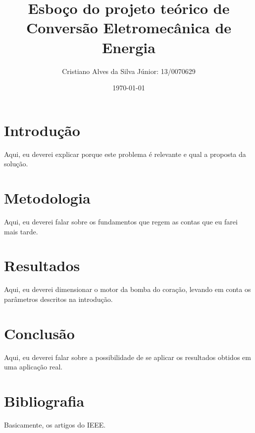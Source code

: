 \documentclass[12pt, a4paper, twoside]{article}
\begin{document}
\title{Esboço do projeto teórico de Conversão Eletromecânica de Energia}
\author{Cristiano Alves da Silva Júnior: 13/0070629}
\date{\today}
\maketitle

\section{Introdução}

Aqui, eu deverei explicar porque este problema é relevante e qual a proposta da solução.

\section{Metodologia}

Aqui, eu deverei falar sobre os fundamentos que regem as contas que eu farei mais tarde.



\section{Resultados}

Aqui, eu deverei dimensionar o motor da bomba do coração, levando em conta os parâmetros descritos na introdução.

\section{Conclusão}

Aqui, eu deverei falar sobre a possibilidade de se aplicar os resultados obtidos em uma aplicação real.

\section{Bibliografia}

Basicamente, os artigos do IEEE.
\end{document}
